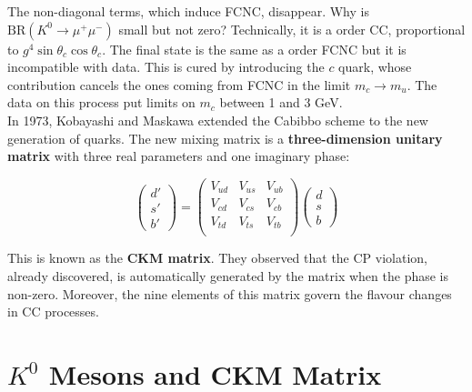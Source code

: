 \documentclass[10.75pt,a4paper,openright,bottom=2cm]{article}
\newcommand{\beginbox}[1]{\begin{tcolorbox}[width=\textwidth,colback={yellow!50},title={#1},colbacktitle={gray!50},coltitle=black]}
\renewcommand{\endbox}{\end{tcolorbox}\noindent}
\begin{document}
The non-diagonal terms, which induce FCNC, disappear. Why is $\text{BR}(K^0\to\mu^+\mu^-)$ small but not zero? Technically, it is a  order CC, proportional to $g^4\sin\theta_c\cos\theta_c$. The final state is the same as a  order FCNC but it is incompatible with data. This is cured by introducing the $c$ quark, whose contribution cancels the ones coming from FCNC in the limit $m_c\to m_u$. The data on this process put limits on $m_c$ between 1 and 3 GeV.\\
In 1973, Kobayashi and Maskawa extended the Cabibbo scheme to the new generation of quarks. The new mixing matrix is a \textbf{three-dimension unitary matrix} with three real parameters and one imaginary phase:
\beginbox{CKM Matrix}
\[
\begin{pmatrix}
    d'\\s'\\b'
\end{pmatrix}=\begin{pmatrix}
    V_{ud} & V_{us} & V_{ub}\\
    V_{cd} & V_{cs} & V_{cb}\\
    V_{td} & V_{ts} & V_{tb}\\
\end{pmatrix}\begin{pmatrix}
    d\\s\\b
\end{pmatrix}
\]
\endbox
This is known as the \textbf{CKM matrix}. They observed that the CP violation, already discovered, is automatically generated by the matrix when the phase is non-zero. Moreover, the nine elements of this matrix govern the flavour changes in CC processes.
\newpage
\section{$K^0$ Mesons and CKM Matrix}
\end{document}
